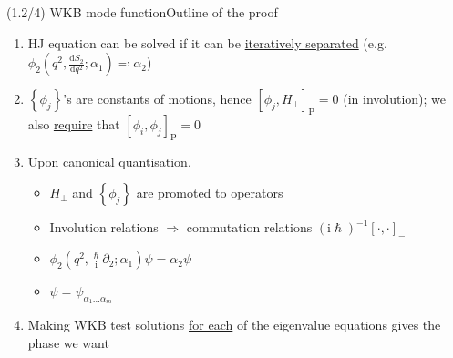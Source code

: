 \documentclass[mathserif]{beamer}
\newcommand{\rbr}[1]{{\left(#1\right)}}
\newcommand{\sbr}[1]{{\left[#1\right]}}
\newcommand{\cbr}[1]{{\left\{#1\right\}}}
\newcommand{\rfun}[2]{#1\mathopen{}\left(#2\right)\mathclose{}}
\newcommand{\dif}{\mathrm{d}}
\newcommand\mi{\mathrm{i}} %
\begin{document}
\begin{frame}{(1.2/4) WKB mode function}{Outline of the proof}
\begin{enumerate}
    \item
    HJ equation can be solved if it can be \underline{iteratively separated}
    (e.g.\ $\rfun{\phi_2}{q^2, \tfrac{\dif S_2}{\dif q^2}; \alpha_1} \eqqcolon \alpha_2$)
    \item $\cbr{\phi_j}$'s are constants of motions, hence 
    $\sbr{\phi_j, H_\perp}_{\text{P}} = 0$ (in involution); we also
    \underline{require} that $\sbr{\phi_i, \phi_j}_\text{P} = 0$
    \item Upon canonical quantisation,
    \begin{itemize}
        \item $H_\perp$ and $\cbr{\phi_j}$ are promoted to operators
        \item Involution relations $\Rightarrow$ commutation relations
        $\rbr{\mi\hslash}^{-1}\sbr{\cdot,\cdot}_{-}$
        \item \alert{$\rfun{\phi_2}%
        {q^2, \tfrac{\hslash}{\mi}\partial_2; \alpha_1} \psi = \alpha_2 \psi$}
        \item $\psi = \psi_{\alpha_1 \ldots \alpha_m}$
    \end{itemize}
    \item Making WKB test solutions \underline{for each} of the eigenvalue
    equations gives the phase we want
\end{enumerate}
\end{frame}
\end{document}
